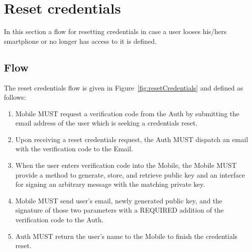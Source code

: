 \section{Reset credentials}
In this section a flow for resetting credentials in case a user looses his/hers
smartphone or no longer has access to it is defined. 

    \subsection{Flow}
    The reset credentials flow is given in Figure~\ref{fig:resetCredentials} and defined as follows:
        \begin{enumerate}
            \item Mobile MUST request a verification code from the Auth by submitting the email address of the user
                  which is seeking a credentials reset.
            \item Upon receiving a reset credentials request, the Auth MUST dispatch an email with the verification
                  code to the Email.
            \item When the user enters verification code into the Mobile, the Mobile MUST provide a method to generate,
                  store, and retrieve public key and an interface for signing an arbitrary message with the matching 
                  private key.
            \item Mobile MUST send user's email, newly generated public key, and the signature of those two parameters
                  with a REQUIRED addition of the verification code to the Auth.
            \item Auth MUST return the user's name to the Mobile to finish the credentials reset.
        \end{enumerate}
        
